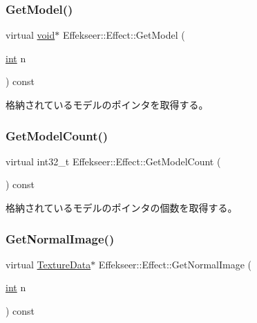 \mbox{\label{class_effekseer_1_1_effect_ac54d6933252509f588a1332187136a1e}} 
\subsubsection{\texorpdfstring{Get\+Model()}{GetModel()}}
{\footnotesize\ttfamily virtual \mbox{\hyperlink{namespace_effekseer_ab34c4088e512200cf4c2716f168deb56}{void}}$\ast$ Effekseer\+::\+Effect\+::\+Get\+Model (\begin{DoxyParamCaption}\item[{\mbox{\hyperlink{namespace_effekseer_ace0abf7c2e6947e519ebe8b54cbcc30a}{int}}}]{n }\end{DoxyParamCaption}) const\hspace{0.3cm}{\ttfamily [pure virtual]}}



格納されているモデルのポインタを取得する。 

\mbox{\label{class_effekseer_1_1_effect_a2f080f7b32e11b7ea2a31744b69cefea}} 
\subsubsection{\texorpdfstring{Get\+Model\+Count()}{GetModelCount()}}
{\footnotesize\ttfamily virtual int32\+\_\+t Effekseer\+::\+Effect\+::\+Get\+Model\+Count (\begin{DoxyParamCaption}{ }\end{DoxyParamCaption}) const\hspace{0.3cm}{\ttfamily [pure virtual]}}



格納されているモデルのポインタの個数を取得する。 

\mbox{\label{class_effekseer_1_1_effect_a01db218b1cdb55feb5425aa602c2e010}} 
\subsubsection{\texorpdfstring{Get\+Normal\+Image()}{GetNormalImage()}}
{\footnotesize\ttfamily virtual \mbox{\hyperlink{struct_effekseer_1_1_texture_data}{Texture\+Data}}$\ast$ Effekseer\+::\+Effect\+::\+Get\+Normal\+Image (\begin{DoxyParamCaption}\item[{\mbox{\hyperlink{namespace_effekseer_ace0abf7c2e6947e519ebe8b54cbcc30a}{int}}}]{n }\end{DoxyParamCaption}) const\hspace{0.3cm}{\ttfamily [pure virtual]}}



